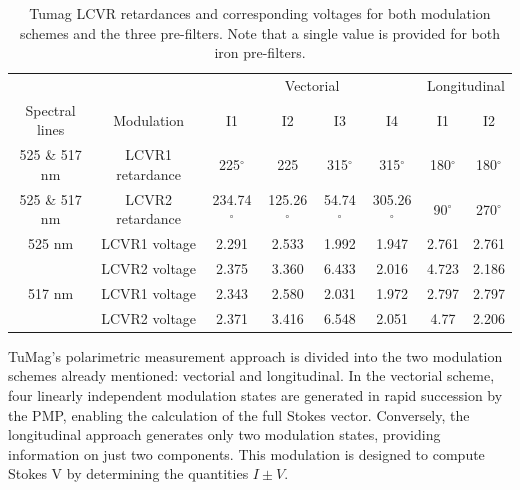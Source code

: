 \begin{table}
    \centering
   \begin{tabular}{cc|cccc|cc}
    \hline
    \hline
     & & \multicolumn{4}{c}{Vectorial} & \multicolumn{2}{|c}{Longitudinal}  \\
     Spectral lines & Modulation & I1 & I2 & I3 & I4 & I1 & I2 \\
    \hline
    525 \& 517 nm & LCVR1 retardance  & 225$^\circ$  & 225 & 315$^\circ$ & 315$^\circ$ & 180$^\circ$  & 180$^\circ$\\
    525 \& 517 nm  & LCVR2 retardance  & 234.74$^\circ$ & 125.26$^\circ$ & 54.74$^\circ$ & 305.26$^\circ$ & 90$^\circ$ & 270$^\circ$ \\
    \hline
    525 nm & LCVR1 voltage & 2.291 & 2.533 & 1.992 & 1.947 & 2.761 & 2.761 \\
     & LCVR2 voltage & 2.375 & 3.360 & 6.433 & 2.016 & 4.723 & 2.186 \\
    \hline
    517 nm & LCVR1 voltage & 2.343 & 2.580 & 2.031 & 1.972 & 2.797 & 2.797\\
     & LCVR2 voltage & 2.371 & 3.416 & 6.548 & 2.051 & 4.77 & 2.206\\
    \hline
    \hline
    \end{tabular}
    \caption{Tumag LCVR retardances and corresponding voltages for both modulation schemes and the three pre-filters. Note that a single value is provided for both iron pre-filters.}
    \label{table: polarimetric configs}
\end{table}

TuMag's polarimetric measurement approach is divided into the two modulation schemes already mentioned: vectorial and longitudinal. In the vectorial scheme, four linearly independent modulation states are generated in rapid succession by the PMP, enabling the calculation of the full Stokes vector. Conversely, the longitudinal approach generates only two modulation states, providing information on just two components. This modulation is designed to compute Stokes V by determining the quantities $I\pm V$.

